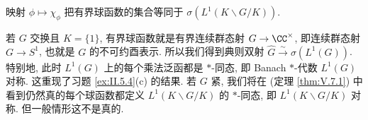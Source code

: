 \begin{theorem}[球函数与谱]
\label{thm:V.4.4}
映射 $\phi \longmapsto \chi_{\phi}$ 把有界球函数的集合等同于 $\sigma(L^1(K\backslash G/K))$.
\end{theorem}

\begin{example}[交换群的情形]
\label{exa:V.4.5}
若 $G$ 交换且 $K = \{1\}$, 有界球函数就是有界连续群态射 $G \to \CC^{\times}$, 即连续群态射 $G \to S^1$, 也就是 $G$ 的不可约酉表示. 所以我们得到典则双射 $\widehat{G} \xrightarrow{\sim} \sigma(L^1(G))$.
特别地, 此时 $L^1(G)$ 上的每个乘法泛函都是 $*$-同态, 即 Banach $*$-代数 $L^1(G)$ 对称. 这重现了习题 \ref{ex:II.5.4}(c) 的结果.
若 $G$ 紧, 我们将在 (定理 \ref{thm:V.7.1}) 中看到仍然真的每个球函数都定义 $L^1(K\backslash G/K)$ 的 $*$-同态, 即 $L^1(K\backslash G/K)$ 对称. 但一般情形这不是真的.
\end{example}

